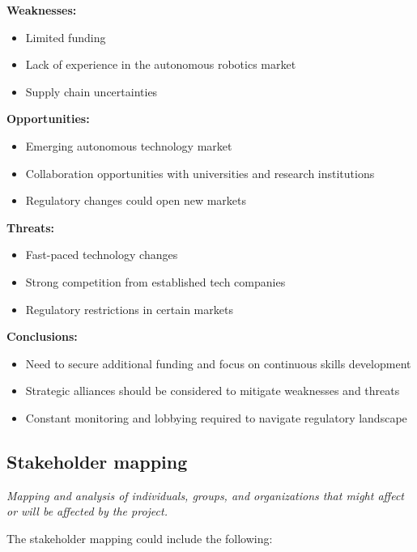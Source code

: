 \documentclass[10pt]{projectdoc}
\begin{document}
\textbf{Weaknesses:}
\begin{itemize}
    \item Limited funding
    \item Lack of experience in the autonomous robotics market
    \item Supply chain uncertainties
\end{itemize}

\textbf{Opportunities:}
\begin{itemize}
    \item Emerging autonomous technology market
    \item Collaboration opportunities with universities and research institutions
    \item Regulatory changes could open new markets
\end{itemize}

\textbf{Threats:}
\begin{itemize}
    \item Fast-paced technology changes
    \item Strong competition from established tech companies
    \item Regulatory restrictions in certain markets
\end{itemize}

\textbf{Conclusions:}
\begin{itemize}
    \item Need to secure additional funding and focus on continuous skills development
    \item Strategic alliances should be considered to mitigate weaknesses and threats
    \item Constant monitoring and lobbying required to navigate regulatory landscape
\end{itemize}

\subsection{Stakeholder mapping}
\textit{Mapping and analysis of individuals, groups, and organizations that might affect or will be affected by the project.}

The stakeholder mapping could include the following:
\end{document}
